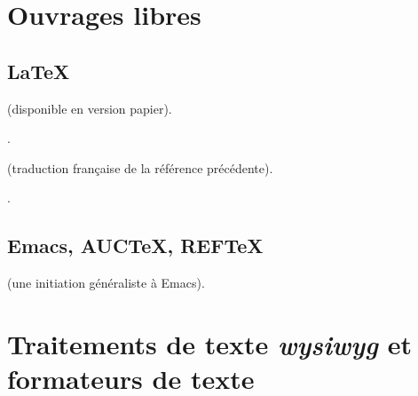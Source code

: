 \section{Ouvrages libres}
\label{sec:freebooks}



\subsection{\LaTeX}

\begin{biblist}
  
   (disponible en version papier).
  
  .
  
   (traduction française de la référence précédente).
  
  .

\end{biblist}

\subsection{Emacs, AUC\TeX, REF\TeX}

\begin{biblist}

   (une initiation généraliste à Emacs).
  


\end{biblist}

\section{Traitements de texte \emph{wysiwyg} et formateurs de texte}


